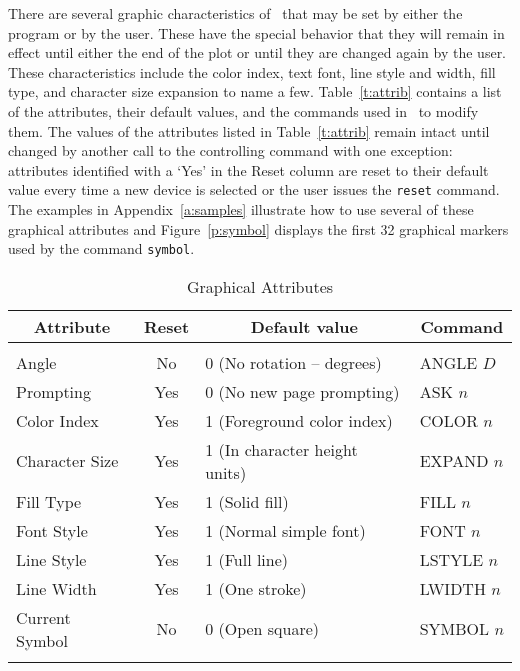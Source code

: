 There are several graphic characteristics of \wip\ that may be set by either the
program or by the user.
These have the special behavior that they will remain in effect
until either the end of the plot or until they are changed again by the user.
These characteristics include the color index, text font, line style
and width, fill type, and character size expansion to name a few.
Table~\ref{t:attrib} contains a list of the attributes,
their default values,
and the commands used in \wip\ to modify them.
The values of the attributes listed in Table~\ref{t:attrib} remain intact
until changed by another call to the controlling command with one exception:
attributes identified with a `Yes' in the Reset column are reset
to their default value every time a new device is selected or the user
issues the {\tt reset} command.
The examples in Appendix~\ref{a:samples} illustrate how to use
several of these graphical attributes
and Figure~\ref{p:symbol} displays the first 32 graphical markers used
by the command {\tt symbol}.
\begin{table}
  \caption{Graphical Attributes}
  \centering
  \begin{tabular}{|l|c|l|l|} \hline\hline
    \multicolumn{1}{|c}{Attribute} & \multicolumn{1}{|c}{Reset} &
    \multicolumn{1}{|c}{Default value} & \multicolumn{1}{|c|}{Command} \\ \hline
    &&& \\
    Angle          & No  & 0 (No rotation -- degrees)      & ANGLE $D$  \\
    Prompting      & Yes & 0 (No new page prompting)       & ASK $n$    \\
    Color Index    & Yes & 1 (Foreground color index)      & COLOR $n$  \\
    Character Size & Yes & 1 (In character height units)   & EXPAND $n$ \\
    Fill Type      & Yes & 1 (Solid fill)                  & FILL $n$   \\
    Font Style     & Yes & 1 (Normal simple font)          & FONT $n$   \\
    Line Style     & Yes & 1 (Full line)                   & LSTYLE $n$ \\
    Line Width     & Yes & 1 (One stroke)                  & LWIDTH $n$ \\
    Current Symbol & No  & 0 (Open square)                 & SYMBOL $n$ \\
    &&& \\ \hline\hline
  \end{tabular}
\end{table}

